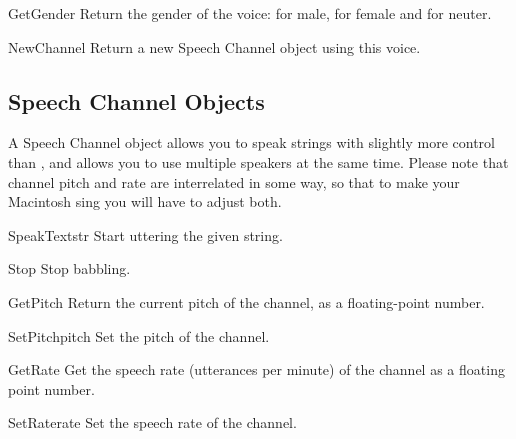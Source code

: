 
\begin{methoddesc}[Voice]{GetGender}{}
Return the gender of the voice:  for male,  for female
and  for neuter.
\end{methoddesc}

\begin{methoddesc}[Voice]{NewChannel}{}
Return a new Speech Channel object using this voice.
\end{methoddesc}

\subsection{Speech Channel Objects}
\label{speech-channel-objects}

A Speech Channel object allows you to speak strings with slightly more
control than , and allows you to use multiple
speakers at the same time. Please note that channel pitch and rate are
interrelated in some way, so that to make your Macintosh sing you will
have to adjust both.

\begin{methoddesc}{SpeakText}{str}
Start uttering the given string.
\end{methoddesc}

\begin{methoddesc}{Stop}{}
Stop babbling.
\end{methoddesc}

\begin{methoddesc}{GetPitch}{}
Return the current pitch of the channel, as a floating-point number.
\end{methoddesc}

\begin{methoddesc}{SetPitch}{pitch}
Set the pitch of the channel.
\end{methoddesc}

\begin{methoddesc}{GetRate}{}
Get the speech rate (utterances per minute) of the channel as a
floating point number.
\end{methoddesc}

\begin{methoddesc}{SetRate}{rate}
Set the speech rate of the channel.
\end{methoddesc}

